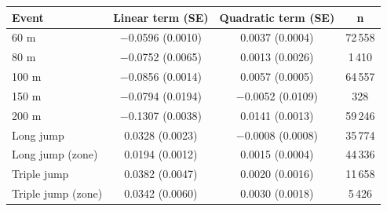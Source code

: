 \begin{tabular}{lccc}
\toprule
Event & Linear term (SE) & Quadratic term (SE) & n \\
\midrule
60 m & $-$0.0596 (0.0010) & 0.0037 (0.0004) & 72\,558 \\
80 m & $-$0.0752 (0.0065) & 0.0013 (0.0026) & 1\,410 \\
100 m & $-$0.0856 (0.0014) & 0.0057 (0.0005) & 64\,557 \\
150 m & $-$0.0794 (0.0194) & $-$0.0052 (0.0109) & 328 \\
200 m & $-$0.1307 (0.0038) & 0.0141 (0.0013) & 59\,246 \\
Long jump & 0.0328 (0.0023) & $-$0.0008 (0.0008) & 35\,774 \\
Long jump (zone) & 0.0194 (0.0012) & 0.0015 (0.0004) & 44\,336 \\
Triple jump & 0.0382 (0.0047) & 0.0020 (0.0016) & 11\,658 \\
Triple jump (zone) & 0.0342 (0.0060) & 0.0030 (0.0018) & 5\,426 \\
\bottomrule
\end{tabular}
